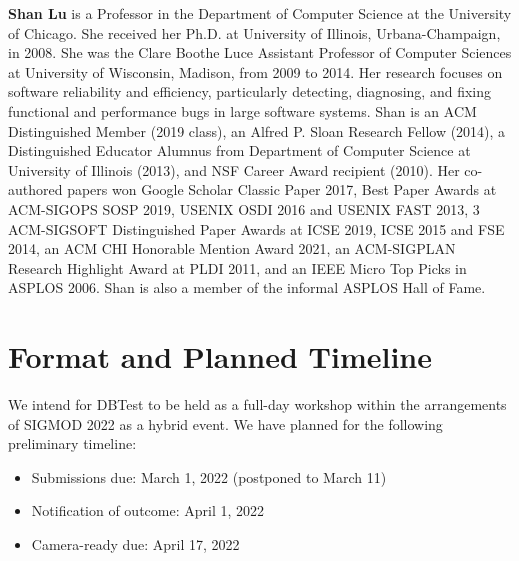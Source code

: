 \documentclass[sigconf]{acmart}
\begin{document}
\textbf{Shan Lu} is a Professor in the Department of Computer Science at the University of Chicago.
She received her Ph.D. at University of Illinois, Urbana-Champaign, in 2008. She was the Clare Boothe Luce Assistant Professor of Computer Sciences at University of Wisconsin, Madison, from 2009 to 2014. Her research focuses on software reliability and efficiency, particularly detecting, diagnosing, and fixing functional and performance bugs in large software systems.
Shan is an ACM Distinguished Member (2019 class), an Alfred P. Sloan Research Fellow (2014), a Distinguished Educator Alumnus from Department of Computer Science at University of Illinois (2013), and NSF Career Award recipient (2010).
Her co-authored papers won Google Scholar Classic Paper 2017, Best Paper Awards at ACM-SIGOPS SOSP 2019, USENIX OSDI 2016 and USENIX FAST 2013, 3 ACM-SIGSOFT Distinguished Paper Awards at ICSE 2019, ICSE 2015 and FSE 2014, an ACM CHI Honorable Mention Award 2021, an ACM-SIGPLAN Research Highlight Award at PLDI 2011, and an IEEE Micro Top Picks in ASPLOS 2006. Shan is also a member of the informal ASPLOS Hall of Fame.


\section{Format and Planned Timeline}

We intend for DBTest to be held as a full-day workshop within the arrangements of SIGMOD 2022 as a hybrid event.
We have planned for the following preliminary timeline:
\begin{itemize}
    \item Submissions due: March 1, 2022 (postponed to March 11)
    \item Notification of outcome: April 1, 2022
    \item Camera-ready due: April 17, 2022
\end{itemize}
\end{document}
